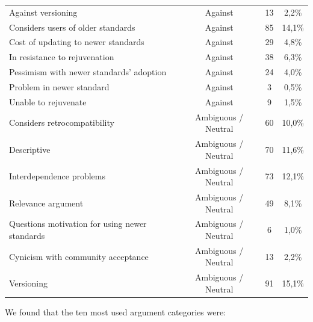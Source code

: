 \begin{table}
\begin{tabular}{@{}lccc@{}}
Against versioning                             & Against                    & 13                        & 2,2\%             \\
Considers users of older standards             & Against                    & 85                        & 14,1\%            \\
Cost of updating to newer standards            & Against                    & 29                        & 4,8\%             \\
In resistance to rejuvenation                  & Against                    & 38                        & 6,3\%             \\
Pessimism with newer standards' adoption       & Against                    & 24                        & 4,0\%             \\
Problem in newer standard                      & Against                    & 3                         & 0,5\%             \\
Unable to rejuvenate                           & Against                    & 9                         & 1,5\%             \\
Considers retrocompatibility                   & Ambiguous / Neutral        & 60                        & 10,0\%            \\
Descriptive                                    & Ambiguous / Neutral        & 70                        & 11,6\%            \\
Interdependence problems                       & Ambiguous / Neutral        & 73                        & 12,1\%            \\
Relevance argument                             & Ambiguous / Neutral        & 49                        & 8,1\%             \\
Questions motivation for using newer standards & Ambiguous / Neutral        & 6                         & 1,0\%             \\
Cynicism with community acceptance             & Ambiguous / Neutral        & 13                        & 2,2\%             \\
Versioning                                     & Ambiguous / Neutral        & 91                        & 15,1\%           
\end{tabular}
\end{table}

We found that the ten most used argument categories were:

